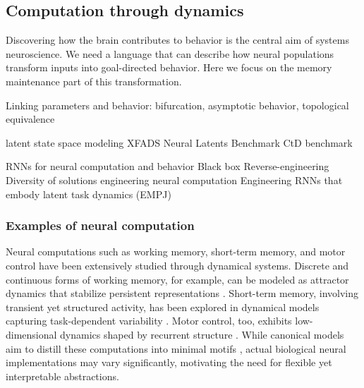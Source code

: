 \documentclass{article}
\theoremstyle{definition} \newtheorem{definition}{Definition}  \newtheorem{example}{Example}
\theoremstyle{remark} \newtheorem{remark}{Remark}
\newcounter{ct}
\begin{document}
\subsection{Computation through dynamics}\label{sec:ctd}
Discovering how the brain contributes to behavior is the central aim of systems neuroscience.
We need a language that can describe how neural populations transform inputs into goal-directed behavior.
Here we focus on the memory maintenance part of this transformation.

 Linking parameters and behavior: bifurcation, asymptotic behavior, topological equivalence \citep{beer1995ctrnn, beer2006parameterspace}

\citep{mante2013context}
\citep{sussillo2014neural}
\citep{vyas2020ctd}
\citep{versteeg2023expressive, sedler2023expressive}
\citep{dinc2025latentcomputing}
latent state space modeling \citep{zoltowski2020general} 
XFADS\citep{Dowling2024b}
Neural Latents Benchmark \citep{pei2neural}
CtD benchmark \citep{versteeg2025computation}

RNNs for neural computation \citep{chaisangmongkon2017transience} and behavior \citep{sani2021nonlinearity} \citep{yang2019task, yang2019multiple, yang2020artificial}
Black box \citep{sussillo2013blackbox}
Reverse-engineering \citep{maheswaranathan2019reverse} \citep{golub2018fixedpointfinder} \citep{smith2021reverse} \citep{rivkind2017local}
Diversity of solutions \citep{maheswaranathan2019universality}\citep{jarne2023initialization} \citep{turner2021charting} \citep{nayebi2021heterogeneity} \citep{zhong2023mechanistic}
%
engineering neural computation \citep{eliasmith2003neuralengineering, eliasmith2005unified, eliasmith2010describe} \citep{beiran2023rnns}
Engineering RNNs that embody latent task dynamics (EMPJ) \citep{pollock2020engineering}


\subsubsection{Examples of neural computation}\label{sec:neurcompex}
Neural computations such as working memory, short-term memory, and motor control have been extensively studied through dynamical systems. Discrete and continuous forms of working memory, for example, can be modeled as attractor dynamics that stabilize persistent representations \citep{zhang2022translation, hoeller2024bridging}.
 Short-term memory, involving transient yet structured activity, has been explored in dynamical models capturing task-dependent variability \citep{kurtkaya2025dynamical}.
 Motor control, too, exhibits low-dimensional dynamics shaped by recurrent structure \citep{wang2022representation}.
 While canonical models aim to distill these computations into minimal motifs \citep{chirimuuta2014minimal}, actual biological neural implementations may vary significantly, motivating the need for flexible yet interpretable abstractions.
\end{document}
